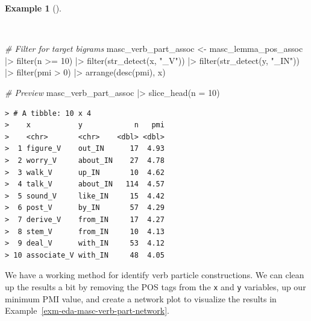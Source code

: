 \documentclass[
  letterpaper,
]{latex/krantz}
\newenvironment{Shaded}{\begin{snugshade}}{\end{snugshade}}
\newcommand{\AttributeTok}[1]{\textcolor[rgb]{0.00,0.00,0.00}{#1}}
\newcommand{\CommentTok}[1]{\textcolor[rgb]{0.00,0.00,0.00}{\textit{#1}}}
\newcommand{\DecValTok}[1]{\textcolor[rgb]{0.00,0.00,0.00}{#1}}
\newcommand{\FunctionTok}[1]{\textcolor[rgb]{0.00,0.00,0.00}{#1}}
\newcommand{\NormalTok}[1]{\textcolor[rgb]{0.00,0.00,0.00}{#1}}
\newcommand{\OtherTok}[1]{\textcolor[rgb]{0.00,0.00,0.00}{#1}}
\newcommand{\SpecialCharTok}[1]{\textcolor[rgb]{0.00,0.00,0.00}{#1}}
\newcommand{\StringTok}[1]{\textcolor[rgb]{0.00,0.00,0.00}{#1}}
\theoremstyle{definition}
\newtheorem{example}{Example}[chapter]
\theoremstyle{remark}
\begin{document}
\begin{example}[]\protect\hypertarget{exm-eda-masc-bigrams-pmi-filtered}{}\label{exm-eda-masc-bigrams-pmi-filtered}

~

\begin{Shaded}
\begin{Highlighting}[]
\CommentTok{\# Filter for target bigrams}
\NormalTok{masc\_verb\_part\_assoc }\OtherTok{\textless{}{-}}
\NormalTok{  masc\_lemma\_pos\_assoc }\SpecialCharTok{|\textgreater{}}
  \FunctionTok{filter}\NormalTok{(n }\SpecialCharTok{\textgreater{}=} \DecValTok{10}\NormalTok{) }\SpecialCharTok{|\textgreater{}}
  \FunctionTok{filter}\NormalTok{(}\FunctionTok{str\_detect}\NormalTok{(x, }\StringTok{"\_V"}\NormalTok{)) }\SpecialCharTok{|\textgreater{}}
  \FunctionTok{filter}\NormalTok{(}\FunctionTok{str\_detect}\NormalTok{(y, }\StringTok{"\_IN"}\NormalTok{)) }\SpecialCharTok{|\textgreater{}}
  \FunctionTok{filter}\NormalTok{(pmi }\SpecialCharTok{\textgreater{}} \DecValTok{0}\NormalTok{) }\SpecialCharTok{|\textgreater{}}
  \FunctionTok{arrange}\NormalTok{(}\FunctionTok{desc}\NormalTok{(pmi), x)}

\CommentTok{\# Preview}
\NormalTok{masc\_verb\_part\_assoc }\SpecialCharTok{|\textgreater{}}
  \FunctionTok{slice\_head}\NormalTok{(}\AttributeTok{n =} \DecValTok{10}\NormalTok{)}
\end{Highlighting}
\end{Shaded}

\begin{verbatim}
> # A tibble: 10 x 4
>    x           y            n   pmi
>    <chr>       <chr>    <dbl> <dbl>
>  1 figure_V    out_IN      17  4.93
>  2 worry_V     about_IN    27  4.78
>  3 walk_V      up_IN       10  4.62
>  4 talk_V      about_IN   114  4.57
>  5 sound_V     like_IN     15  4.42
>  6 post_V      by_IN       57  4.29
>  7 derive_V    from_IN     17  4.27
>  8 stem_V      from_IN     10  4.13
>  9 deal_V      with_IN     53  4.12
> 10 associate_V with_IN     48  4.05
\end{verbatim}

\end{example}

We have a working method for identify verb particle constructions. We
can clean up the results a bit by removing the POS tags from the
\texttt{x} and \texttt{y} variables, up our minimum PMI value, and
create a network plot to visualize the results in
Example~\ref{exm-eda-masc-verb-part-network}.
\end{document}
